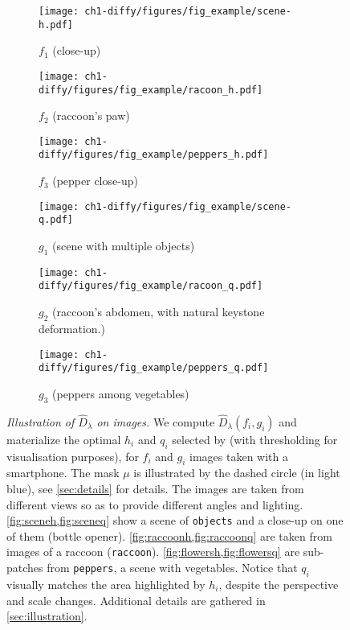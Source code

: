 \begin{figure*}[ht]
\centering
    \begin{subfigure}{0.25\textwidth}
\texttt{[image: ch1-diffy/figures/fig\_example/scene-h.pdf]}
\caption{$f_1$ (close-up)}
\label{fig:sceneh}
    \end{subfigure}\hfil
    \begin{subfigure}{0.25\textwidth}
\texttt{[image: ch1-diffy/figures/fig\_example/racoon\_h.pdf]}
\caption{$f_2$ (raccoon's paw)}
\label{fig:raccoonh}    \end{subfigure}\hfil
     \begin{subfigure}{0.25\textwidth}
\texttt{[image: ch1-diffy/figures/fig\_example/peppers\_h.pdf]}
\caption{$f_3$ (pepper close-up)}
\label{fig:flowersh}
    \end{subfigure}
\smallskip
     \begin{subfigure}{0.25\textwidth}
\texttt{[image: ch1-diffy/figures/fig\_example/scene-q.pdf]}
\caption{$g_1$ (scene with multiple objects)}
\label{fig:sceneq}
    \end{subfigure}\hfil
     \begin{subfigure}{0.25\textwidth}
\texttt{[image: ch1-diffy/figures/fig\_example/racoon\_q.pdf]}
\caption{$g_2$ (raccoon's abdomen, with natural keystone deformation.)}
\label{fig:raccoonq}
    \end{subfigure}\hfil
     \begin{subfigure}{0.25\textwidth}
\texttt{[image: ch1-diffy/figures/fig\_example/peppers\_q.pdf]}
\caption{$g_3$ (peppers among vegetables)}
\label{fig:flowersq}
    \end{subfigure}
\caption{\emph{Illustration of $\widehat D_\lambda$ on images.} We compute $\widehat D_\lambda(f_i, g_i)$ and materialize the optimal $h_i$ and $q_i$ selected by \Diffy (with thresholding for visualisation purposes), for $f_i$ and $g_i$ images taken with a smartphone. The mask $\mu$ is illustrated by the dashed circle (in light blue), see \cref{sec:details} for details. The images are taken from different views so as to provide different angles and lighting. \cref{fig:sceneh,fig:sceneq} show a scene of \texttt{objects} and a close-up on one of them (bottle opener). \cref{fig:raccoonh,fig:raccoonq} are taken from images of a raccoon (\texttt{raccoon}). \cref{fig:flowersh,fig:flowersq} are sub-patches from \texttt{peppers}, a scene with vegetables. Notice that $q_i$ visually matches the area highlighted by $h_i$, despite the perspective and scale changes. Additional details are gathered in \cref{sec:illustration}.}
\label{fig:example}
    \end{figure*}


